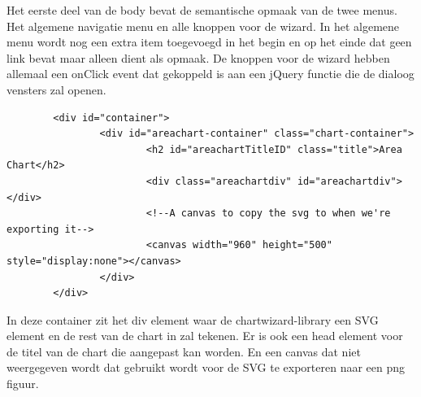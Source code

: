 Het eerste deel van de body bevat de semantische opmaak van de twee menus. Het algemene navigatie menu en alle knoppen voor de wizard. In het algemene menu wordt nog een extra item toegevoegd in het begin en op het einde dat geen link bevat maar alleen dient als opmaak. De knoppen voor de wizard hebben allemaal een onClick event dat gekoppeld is aan een jQuery functie die de dialoog vensters zal openen.

\begin{lstlisting}                
        <div id="container">
                <div id="areachart-container" class="chart-container">
                        <h2 id="areachartTitleID" class="title">Area Chart</h2>
                        <div class="areachartdiv" id="areachartdiv"></div>
                        <!--A canvas to copy the svg to when we're exporting it-->
                        <canvas width="960" height="500" style="display:none"></canvas>
                </div>
        </div>
\end{lstlisting}

In deze container zit het div element waar de chartwizard-library een SVG element en de rest van de chart in zal tekenen. Er is ook een head element voor de titel van de chart die aangepast kan worden. En een canvas dat niet weergegeven wordt dat gebruikt wordt voor de SVG te exporteren naar een png figuur.

